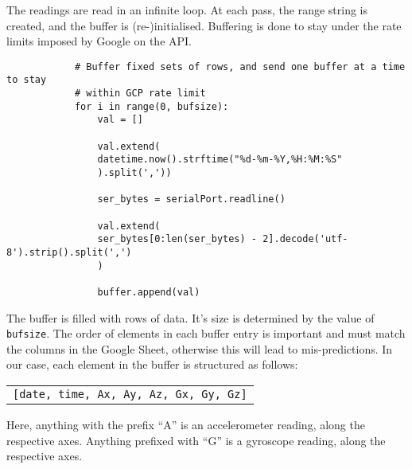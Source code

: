 \documentclass[./RTPostureTrackingReport.tex]{subfiles}
\begin{document}
The readings are read in an infinite loop. At each pass, the range string is
created, and the buffer is (re-)initialised. Buffering is done to stay under
the rate limits imposed by Google on the API.

\begin{code}
    \begin{verbatim}
            # Buffer fixed sets of rows, and send one buffer at a time to stay
            # within GCP rate limit
            for i in range(0, bufsize):
                val = []

                val.extend(
                datetime.now().strftime("%d-%m-%Y,%H:%M:%S"
                ).split(','))

                ser_bytes = serialPort.readline()

                val.extend(
                ser_bytes[0:len(ser_bytes) - 2].decode('utf-8').strip().split(',')
                )

                buffer.append(val)
    \end{verbatim}
    \caption{Populate the buffer}
    \label{code:popbuf}
\end{code}
\vspace{0.5cm}

The buffer is filled with rows of data. It's size is determined by the value of
\texttt{bufsize}. The order of elements in each buffer entry is important and
must match the columns in the Google Sheet, otherwise this will lead to
mis-predictions. In our case, each element in the buffer is structured as
follows:
\begin{code}
    \begin{table}[H]
        \centering
        \begin{tabular}{c}
            \texttt{[date, time, Ax, Ay, Az, Gx, Gy, Gz]}
        \end{tabular}
    \end{table}
    \caption{Value list format}
    \label{code:vallist}
\end{code}
\vspace{0.5cm}

Here, anything with the prefix ``A'' is an accelerometer reading, along the
respective axes. Anything prefixed with ``G'' is a gyroscope reading, along the
respective axes.
\end{document}
